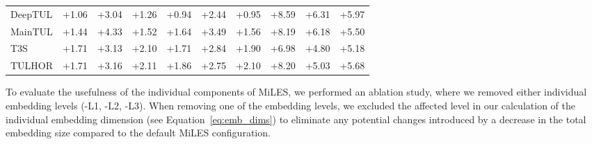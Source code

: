 \documentclass{article} %
\theoremstyle{definition}
\begin{document}
\begin{table}[ht]
\begin{tabular}{lccccccccc}
        DeepTUL  & {\cellcolor[HTML]{EEF8A8}} \color[HTML]{000000} +1.06 & {\cellcolor[HTML]{CBE982}} \color[HTML]{000000} +3.04 & {\cellcolor[HTML]{EBF7A3}} \color[HTML]{000000} +1.26 & {\cellcolor[HTML]{EFF8AA}} \color[HTML]{000000} +0.94 & {\cellcolor[HTML]{D9EF8B}} \color[HTML]{000000} +2.44 & {\cellcolor[HTML]{EFF8AA}} \color[HTML]{000000} +0.95 & {\cellcolor[HTML]{39A758}} \color[HTML]{000000} +8.59 & {\cellcolor[HTML]{7DC765}} \color[HTML]{000000} +6.31 & {\cellcolor[HTML]{87CB67}} \color[HTML]{000000} +5.97 \\
        MainTUL  & {\cellcolor[HTML]{E8F59F}} \color[HTML]{000000} +1.44 & {\cellcolor[HTML]{AFDD70}} \color[HTML]{000000} +4.33 & {\cellcolor[HTML]{E6F59D}} \color[HTML]{000000} +1.52 & {\cellcolor[HTML]{E5F49B}} \color[HTML]{000000} +1.64 & {\cellcolor[HTML]{C1E57B}} \color[HTML]{000000} +3.49 & {\cellcolor[HTML]{E6F59D}} \color[HTML]{000000} +1.56 & {\cellcolor[HTML]{45AD5B}} \color[HTML]{000000} +8.19 & {\cellcolor[HTML]{82C966}} \color[HTML]{000000} +6.18 & {\cellcolor[HTML]{93D168}} \color[HTML]{000000} +5.50 \\
        T3S      & {\cellcolor[HTML]{E3F399}} \color[HTML]{000000} +1.71 & {\cellcolor[HTML]{C9E881}} \color[HTML]{000000} +3.13 & {\cellcolor[HTML]{DDF191}} \color[HTML]{000000} +2.10 & {\cellcolor[HTML]{E3F399}} \color[HTML]{000000} +1.71 & {\cellcolor[HTML]{CFEB85}} \color[HTML]{000000} +2.84 & {\cellcolor[HTML]{E0F295}} \color[HTML]{000000} +1.90 & {\cellcolor[HTML]{6BBF64}} \color[HTML]{000000} +6.98 & {\cellcolor[HTML]{A5D86A}} \color[HTML]{000000} +4.80 & {\cellcolor[HTML]{9BD469}} \color[HTML]{000000} +5.18 \\
        TULHOR   & {\cellcolor[HTML]{E3F399}} \color[HTML]{000000} +1.71 & {\cellcolor[HTML]{C9E881}} \color[HTML]{000000} +3.16 & {\cellcolor[HTML]{DDF191}} \color[HTML]{000000} +2.11 & {\cellcolor[HTML]{E2F397}} \color[HTML]{000000} +1.86 & {\cellcolor[HTML]{D1EC86}} \color[HTML]{000000} +2.75 & {\cellcolor[HTML]{DDF191}} \color[HTML]{000000} +2.10 & {\cellcolor[HTML]{45AD5B}} \color[HTML]{000000} +8.20 & {\cellcolor[HTML]{A0D669}} \color[HTML]{000000} +5.03 & {\cellcolor[HTML]{8ECF67}} \color[HTML]{000000} +5.68 \\
        \bottomrule
    \end{tabular}
\end{table}
To evaluate the usefulness of the individual components of MiLES, we performed an ablation study, where we removed either individual embedding levels (-L1, -L2, -L3).
When removing one of the embedding levels, we excluded the affected level in our calculation of the individual embedding dimension (see Equation~\ref{eq:emb_dims}) to eliminate any potential changes introduced by a decrease in the total embedding size compared to the default MiLES configuration.
\end{document}
